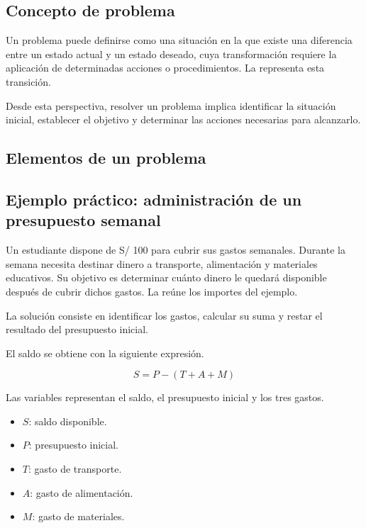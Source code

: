 \subsection{Concepto de problema}

Un problema puede definirse como una situación en la que existe una diferencia entre un estado actual y un estado deseado, cuya transformación requiere la aplicación de determinadas acciones o procedimientos. La  representa esta transición.


Desde esta perspectiva, resolver un problema implica identificar la situación inicial, establecer el objetivo y determinar las acciones necesarias para alcanzarlo.

\subsection{Elementos de un problema}



\subsection{Ejemplo práctico: administración de un presupuesto semanal}

Un estudiante dispone de S/ 100 para cubrir sus gastos semanales. Durante la semana necesita destinar dinero a transporte, alimentación y materiales educativos. Su objetivo es determinar cuánto dinero le quedará disponible después de cubrir dichos gastos. La  reúne los importes del ejemplo.



La solución consiste en identificar los gastos, calcular su suma y restar el resultado del presupuesto inicial.

El saldo se obtiene con la siguiente expresión.

\[ S = P - (T + A + M) \]

Las variables representan el saldo, el presupuesto inicial y los tres gastos.

\begin{itemize}
\item \(S\): saldo disponible.
\item \(P\): presupuesto inicial.
\item \(T\): gasto de transporte.
\item \(A\): gasto de alimentación.
\item \(M\): gasto de materiales.
\end{itemize}


